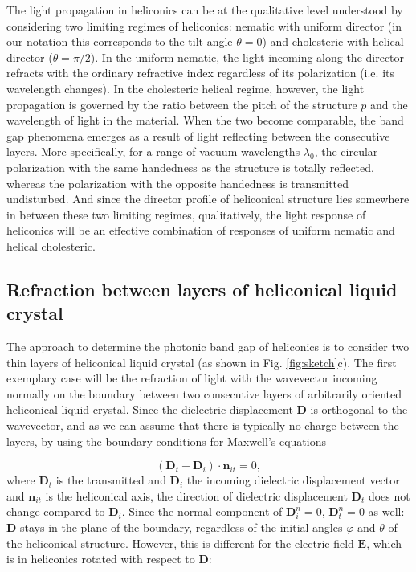 \documentclass{osa-article}
\renewcommand{\vec}[1]{\mathbf{#1}}
\begin{document}
The light propagation in heliconics can be at the qualitative level understood by considering two limiting regimes of heliconics: 
nematic with uniform director (in our notation this corresponds to the tilt angle $\theta=0$) and cholesteric with helical director ($\theta=\pi/2$).
In the uniform nematic, the light incoming along the director refracts with the ordinary refractive index regardless of its polarization (i.e. its wavelength changes). 
In the cholesteric helical regime, however, the light propagation is governed by the ratio between the pitch of the structure $p$ and the wavelength of light in the material. 
When the two become comparable, the band gap phenomena emerges as a result of light reflecting between the consecutive layers. 
More specifically, for a range of vacuum wavelengths $\lambda_0$, the circular polarization with the same handedness as the structure 
is totally reflected, whereas the polarization with the opposite handedness is transmitted undisturbed. 
And since the director profile of heliconical structure lies somewhere in between these two limiting regimes, qualitatively, 
the light response of heliconics will be an effective combination of responses of uniform nematic and helical cholesteric. 

\subsection{Refraction between layers of heliconical liquid crystal}

The approach to determine the photonic band gap of heliconics is to consider two thin layers of heliconical liquid crystal (as shown in Fig. \ref{fig:sketch}c).
The first exemplary case will be the refraction of light with the wavevector incoming normally 
on the boundary between two consecutive layers of arbitrarily oriented heliconical liquid crystal.
Since the dielectric displacement $\vec{D}$ is orthogonal to the wavevector, and as we can assume that there is typically no charge between the layers, 
by using the boundary conditions for Maxwell's equations

\begin{equation}
(\vec{D}_t-\vec{D}_i) \cdot \vec{n}_{it} = 0,
\end{equation}
where $\vec{D}_t$ is the transmitted and $\vec{D}_i$ the incoming dielectric displacement vector and $\vec{n}_{it}$ is the heliconical axis, 
the direction of dielectric displacement $\vec{D}_t$ does not change compared to $\vec{D}_i$.
Since the normal component of $\vec{D}_i^n = 0$, $\vec{D}_t^n = 0$ as well: 
$\vec{D}$ stays in the plane of the boundary, regardless of the initial angles $\varphi$ and $\theta$ of the heliconical structure. 
However, this is different for the electric field $\vec{E}$, which is in heliconics rotated with respect to $\vec{D}$: 
\end{document}
